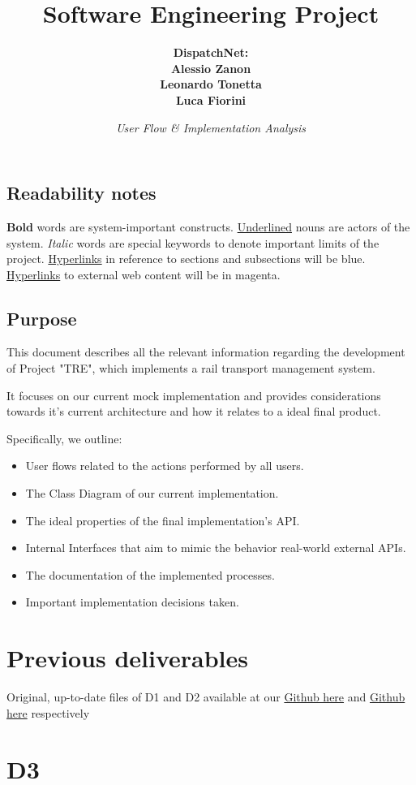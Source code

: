 \documentclass[12pt]{report}
\title{\bf{Software Engineering Project}}
\author{\bf{DispatchNet:} \\ Alessio Zanon \\ Leonardo Tonetta \\ Luca Fiorini}
\date{\it{User Flow \& Implementation Analysis}}
\renewcommand\bf[1]{\textbf{#1}}
\renewcommand\it[1]{\textit{#1}}
\newcommand\un[1]{\underline{#1}}
\newcommand\gitter[1]{
	\href{https://github.com/DispatchNet/TRE/blob/main/#1}{Github here}
}
\begin{document}
\maketitle

\newpage
\tableofcontents \label{Contents}

\section*{Readability notes}
\bf{Bold} words are system-important constructs. \newline
\un{Underlined} nouns are actors of the system. \newline
\it{Italic} words are special keywords to denote important limits of the project. \newline
\hyperref[Contents]{Hyperlinks} in reference to sections and subsections will be blue. \newline
\href{https:\\www.google.com}{Hyperlinks} to external web content will be in magenta. \newline

\newpage

\section*{Purpose}
This document describes all the relevant information regarding the development of Project "TRE", which implements a rail transport management system.

It focuses on our current mock implementation and provides considerations towards it's current architecture and how it relates to a ideal final product.

Specifically, we outline:
\begin{itemize}
  \item User flows related to the actions performed by all users.  
  \item The Class Diagram of our current implementation.
  \item The ideal properties of the final implementation's API.
  \item Internal Interfaces that aim to mimic the behavior real-world external APIs.
  \item The documentation of the implemented processes.
  \item Important implementation decisions taken.
\end{itemize}

\newpage

\chapter{Previous deliverables}
Original, up-to-date files of D1 and D2 available at our \gitter{D1_DispatchNet/D1_DispatchNet.pdf} and \gitter{D2_DispatchNet/D2_DispatchNet.pdf} respectively


\chapter{D3}

\end{document}
